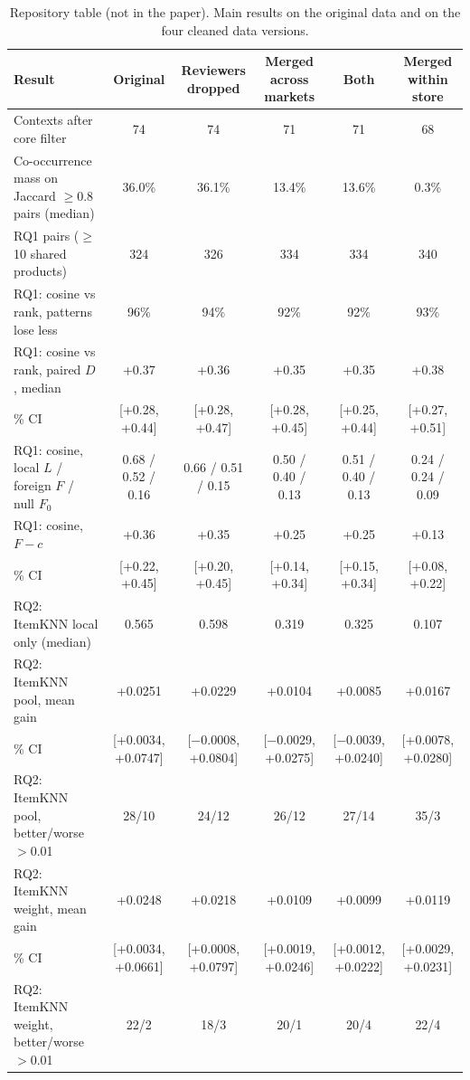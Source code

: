 \begin{table}[H]
\caption{Repository table (not in the paper). Main results on the original data and on the four cleaned data versions.}
\centering\scriptsize\setlength{\tabcolsep}{2.2pt}
\begin{tabular}{>{\raggedright\arraybackslash}p{4.8cm}ccccc}
\toprule
Result & Original & Reviewers dropped & Merged across markets & Both & Merged within store \\
\midrule
Contexts after core filter & 74 & 74 & 71 & 71 & 68 \\
Co-occurrence mass on Jaccard $\geq$0.8 pairs (median) & 36.0\% & 36.1\% & 13.4\% & 13.6\% & 0.3\% \\
RQ1 pairs ($\geq$10 shared products) & 324 & 326 & 334 & 334 & 340 \\
RQ1: cosine vs rank, patterns lose less & 96\% & 94\% & 92\% & 92\% & 93\% \\
RQ1: cosine vs rank, paired $D$, median & +0.37 & +0.36 & +0.35 & +0.35 & +0.38 \\
\quad 95\% CI & [+0.28, +0.44] & [+0.28, +0.47] & [+0.28, +0.45] & [+0.25, +0.44] & [+0.27, +0.51] \\[1pt]
RQ1: cosine, local $L$ / foreign $F$ / null $F_0$ & 0.68 / 0.52 / 0.16 & 0.66 / 0.51 / 0.15 & 0.50 / 0.40 / 0.13 & 0.51 / 0.40 / 0.13 & 0.24 / 0.24 / 0.09 \\
RQ1: cosine, $F-c$ & +0.36 & +0.35 & +0.25 & +0.25 & +0.13 \\
\quad 95\% CI & [+0.22, +0.45] & [+0.20, +0.45] & [+0.14, +0.34] & [+0.15, +0.34] & [+0.08, +0.22] \\[1pt]
RQ2: ItemKNN local only (median) & 0.565 & 0.598 & 0.319 & 0.325 & 0.107 \\
RQ2: ItemKNN pool, mean gain & +0.0251 & +0.0229 & +0.0104 & +0.0085 & +0.0167 \\
\quad 95\% CI & [+0.0034, +0.0747] & [$-$0.0008, +0.0804] & [$-$0.0029, +0.0275] & [$-$0.0039, +0.0240] & [+0.0078, +0.0280] \\[1pt]
RQ2: ItemKNN pool, better/worse $>$0.01 & 28/10 & 24/12 & 26/12 & 27/14 & 35/3 \\
RQ2: ItemKNN weight, mean gain & +0.0248 & +0.0218 & +0.0109 & +0.0099 & +0.0119 \\
\quad 95\% CI & [+0.0034, +0.0661] & [+0.0008, +0.0797] & [+0.0019, +0.0246] & [+0.0012, +0.0222] & [+0.0029, +0.0231] \\[1pt]
RQ2: ItemKNN weight, better/worse $>$0.01 & 22/2 & 18/3 & 20/1 & 20/4 & 22/4 \\

\end{tabular}
\end{table}
